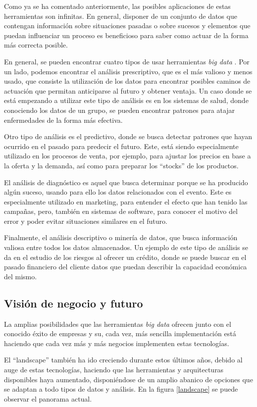 Como ya se ha comentado anteriormente, las posibles aplicaciones de estas herramientas son infinitas. En general, disponer de un conjunto de datos que contengan información sobre situaciones pasadas o sobre sucesos y elementos que puedan influenciar un proceso es beneficioso para saber como actuar de la forma más correcta posible.

En general, se pueden encontrar cuatro tipos de usar herramientas \textit{big data} \cite{tipoAnalisis}. Por un lado, podemos encontrar el análisis prescriptivo, que es el más valioso y menos usado, que consiste la utilización de los datos para encontrar posibles caminos de actuación que permitan anticiparse al futuro y obtener ventaja. Un caso donde se está empezando a utilizar este tipo de análisis es en los sistemas de salud, donde conociendo los datos de un grupo, se pueden encontrar patrones para atajar enfermedades de la forma más efectiva.

Otro tipo de análisis es el predictivo, donde se busca detectar patrones que hayan ocurrido en el pasado para predecir el futuro. Este, está siendo especialmente utilizado en los procesos de venta, por ejemplo, para ajustar los precios en base a la oferta y la demanda, así como para preparar los ``stocks'' de los productos.

El análisis de diagnóstico es aquel que busca determinar porque se ha producido algún suceso, usando para ello los datos relacionados con el evento. Este es especialmente utilizado en marketing, para entender el efecto que han tenido las campañas, pero, también en sistemas de software, para conocer el motivo del error y poder evitar situaciones similares en el futuro.

Finalmente, el análisis descriptivo o minería de datos, que busca información valiosa entre todos los datos almacenados. Un ejemplo de este tipo de análisis se da en el estudio de los riesgos al ofrecer un crédito, donde se puede buscar en el pasado financiero del cliente datos que puedan describir la capacidad económica del mismo.

\subsection{Visión de negocio y futuro}
La amplias posibilidades que las herramientas \textit{big data} ofrecen junto con el conocido éxito de empresas y su, cada vez, más sencilla implementación está haciendo que cada vez más y más negocios implementen estas tecnologías.

El ``landscape'' también ha ido creciendo durante estos últimos años, debido al auge de estas tecnologías, haciendo que las herramientas y arquitecturas disponibles haya aumentado, disponiéndose de un amplio abanico de opciones que se adaptan a todo tipos de datos y análisis. En la figura \ref{landscape} se puede observar el panorama actual.


